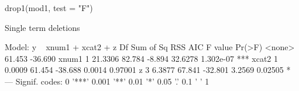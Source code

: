 \begin{Schunk}
\begin{Sinput}
 drop1(mod1, test = "F")
\end{Sinput}
\begin{Soutput}
Single term deletions

Model:
y ~ xnum1 + xcat2 + z
       Df Sum of Sq    RSS     AIC F value    Pr(>F)    
<none>              61.453 -36.690                      
xnum1   1   21.3306 82.784  -8.894 32.6278 1.302e-07 ***
xcat2   1    0.0009 61.454 -38.688  0.0014   0.97001    
z       3    6.3877 67.841 -32.801  3.2569   0.02505 *  
---
Signif. codes:  0 '***' 0.001 '**' 0.01 '*' 0.05 '.' 0.1 ' ' 1
\end{Soutput}
\end{Schunk}
